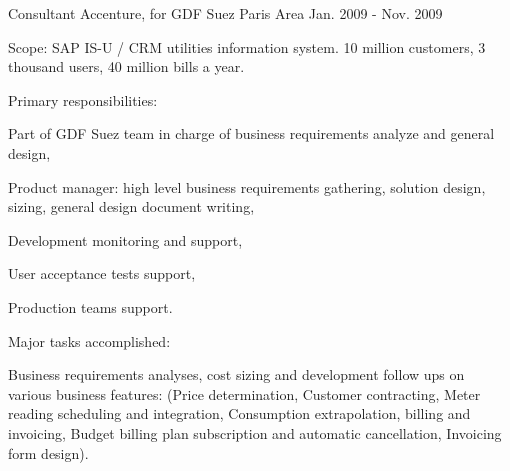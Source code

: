 \begin{cventries}
  \cventry
    {Consultant} %
    {Accenture, for GDF Suez} %
    {Paris Area} %
    {Jan. 2009 - Nov. 2009} %
    {
      \begin{cvitems} %
        \item {Scope: SAP IS-U / CRM utilities information system. 10 million customers, 3 thousand users, 40 million bills a year.}
        \item {Primary responsibilities:}
        \begin{cvsubitems}
          \item {Part of GDF Suez team in charge of business requirements analyze and general design,}
          \item {Product manager: high level business requirements gathering, solution design, sizing, general design document writing,}
          \item {Development monitoring and support,}
          \item {User acceptance tests support,}
          \item {Production teams support.}
        \end{cvsubitems}
        \item {Major tasks accomplished:}
        \begin{cvsubitems}
          \item {Business requirements analyses, cost sizing and development follow ups on various business features: (Price determination, Customer contracting, Meter reading scheduling and integration, Consumption extrapolation, billing and invoicing, Budget billing plan subscription and automatic cancellation, Invoicing form design).}
        \end{cvsubitems}
      \end{cvitems}
    }


\end{cventries}
